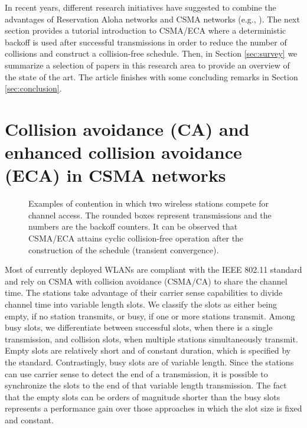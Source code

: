 \documentclass[journal]{IEEEtran}
\begin{document}
In recent years, different research initiatives have suggested to combine the advantages of Reservation Aloha networks and CSMA networks (e.g., \cite{he2009srb,barcelo2010fcc,fang2011dlm,barcelo2011tcf}). 
The next section provides a tutorial introduction to CSMA/ECA where a deterministic backoff is used after successful transmissions in order to reduce the number of collisions and construct a collision-free schedule. 
Then, in Section \ref{sec:survey} we summarize a selection of papers in this research area to provide an overview of the state of the art. 
The article finishes with some concluding remarks in Section \ref{sec:conclusion}.

\section{Collision avoidance (CA) and enhanced collision avoidance (ECA) in CSMA networks}
\label{sec:eca}

\begin{figure}[!t]
\centering
{}
\caption{Examples of contention in which two wireless stations compete for channel access. The rounded boxes represent transmissions and the numbers are the backoff counters. It can be observed that CSMA/ECA attains cyclic collision-free operation after the construction of the schedule (transient convergence).}
\label{fig:ca_vs_eca}
\end{figure}

Most of currently deployed WLANs are compliant with the IEEE 802.11 standard and rely on CSMA with collision avoidance (CSMA/CA) to share the channel time.
The stations take advantage of their carrier sense capabilities to divide channel time into variable length slots.
We classify the slots as either being empty, if no station transmits, or busy, if one or more stations transmit.
Among busy slots, we differentiate between successful slots, when there is a single transmission, and collision slots, when multiple stations simultaneously transmit.
Empty slots are relatively short and of constant duration, which is specified by the standard.
Contrastingly, busy slots are of variable length. 
Since the stations can use carrier sense to detect the end of a transmission, it is possible to synchronize the slots to the end of that variable length transmission.
The fact that the empty slots can be orders of magnitude shorter than the busy slots represents a performance gain over those approaches in which the slot size is fixed and constant.
\end{document}
